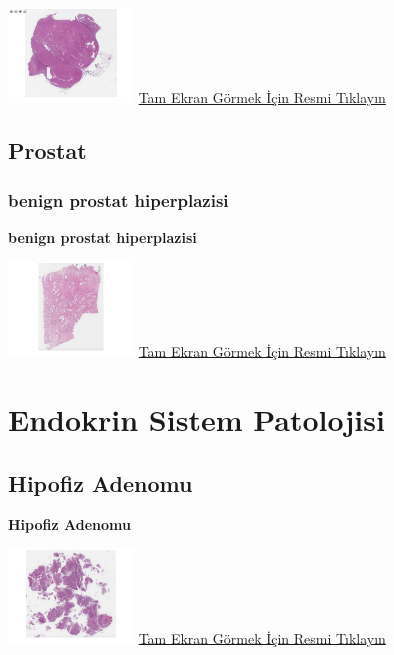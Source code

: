 \documentclass[
  letterpaper,
  DIV=11,
  numbers=noendperiod]{scrreprt}
\begin{document}
\href{https://images.patolojiatlasi.com/kidneyoncocytoma/HE.html}{\includegraphics[width=0.25\textwidth,height=\textheight]{./screenshots/kidneyoncocytoma_screenshot.png}}
\href{https://images.patolojiatlasi.com/kidneyoncocytoma/HE.html}{Tam
Ekran Görmek İçin Resmi Tıklayın}

\hypertarget{sec-prostat}{%
\chapter{Prostat}\label{sec-prostat}}

\hypertarget{sec-benign-prostat-hiperplazisi}{%
\section{benign prostat
hiperplazisi}\label{sec-benign-prostat-hiperplazisi}}

\textbf{benign prostat hiperplazisi}

\href{https://images.patolojiatlasi.com/benign-prostate-hyperplasia/HE.html}{\includegraphics[width=0.25\textwidth,height=\textheight]{./screenshots/benign-prostate-hyperplasia_screenshot.png}}
\href{https://images.patolojiatlasi.com/benign-prostate-hyperplasia/HE.html}{Tam
Ekran Görmek İçin Resmi Tıklayın}

\part{Endokrin Sistem Patolojisi}

\hypertarget{sec-hipofiz-adenomu}{%
\chapter{Hipofiz Adenomu}\label{sec-hipofiz-adenomu}}

\textbf{Hipofiz Adenomu}

\href{https://images.patolojiatlasi.com/pituitary-adenoma/HE.html}{\includegraphics[width=0.25\textwidth,height=\textheight]{./screenshots/pituitary-adenoma_screenshot.png}}
\href{https://images.patolojiatlasi.com/pituitary-adenoma/HE.html}{Tam
Ekran Görmek İçin Resmi Tıklayın}
\end{document}
